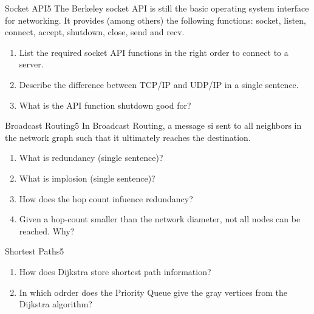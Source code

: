 \documentclass[twoside]{article}
\begin{document}
\begin{task}{Socket API}{5}{}
  The Berkeley socket API is still the basic operating system interface for networking. It provides (among others) the following functions: socket, listen, connect, accept, shutdown, close, send and recv.
  
  \begin{enumerate}
  \item{ List the required socket API functions in the right order to connect to a server. \vspace*{2cm}}
  \item{Describe the difference between TCP/IP and UDP/IP in a single sentence.}
    \item{What is the API function shutdown good for?}
    \end{enumerate}
  \end{task}
\clearpage
\begin{task}{Broadcast Routing}{5}{}
  In Broadcast Routing, a message si sent to all neighbors in the network graph such that it ultimately reaches the destination.
  \begin{enumerate}
  \item{What is redundancy (single sentence)?\vspace*{2cm}}
  \item{What is implosion (single sentence)?\vspace*{2cm}}
  \item{How does the hop count infuence redundancy?\vspace*{2cm}}
  \item{Given a hop-count smaller than the network diameter, not all nodes can be reached. Why?\vspace*{2cm}}
    \end{enumerate}
  
  \end{task}
\clearpage
\begin{task}{Shortest Paths}{5}{}
  \begin{enumerate}
  \item {How does Dijkstra store shortest path information? \vspace*{2cm}}
  \item{In which odrder does the Priority Queue give the gray vertices from the Dijkstra algorithm?}
    \end{enumerate}
  
\end{task}
\end{document}
